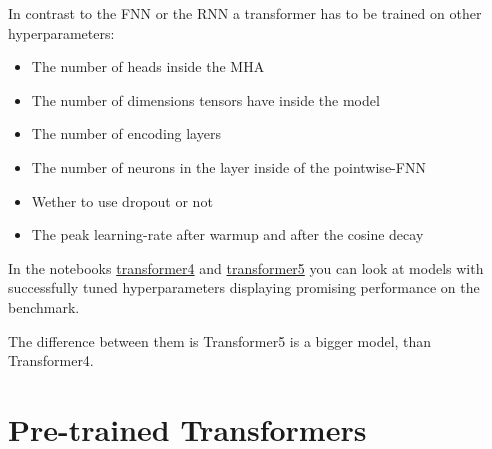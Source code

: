 \documentclass{article}
\begin{document}
In contrast to the FNN or the RNN a transformer has to be trained on other 
hyperparameters: 
\begin{itemize}
    \item The number of heads inside the MHA
    \item The number of dimensions tensors have inside the model
    \item The number of encoding layers
    \item The number of neurons in the layer inside of the pointwise-FNN
    \item Wether to use dropout or not
    \item The peak learning-rate after warmup and after the cosine decay
\end{itemize}


In the notebooks \href{https://github.com/AntonStantan/matura/blob/main/transformer/transformer4.ipynb}
{transformer4} and \href{https://github.com/AntonStantan/matura/blob/main/transformer/transformer5.ipynb}
{transformer5} you can look at models with successfully tuned 
hyperparameters displaying promising performance on the benchmark.

The difference between them is Transformer5 is a bigger model, than 
Transformer4.

\section{Pre-trained Transformers}


\newpage
\printbibliography[heading=bibintoc]
\end{document}
